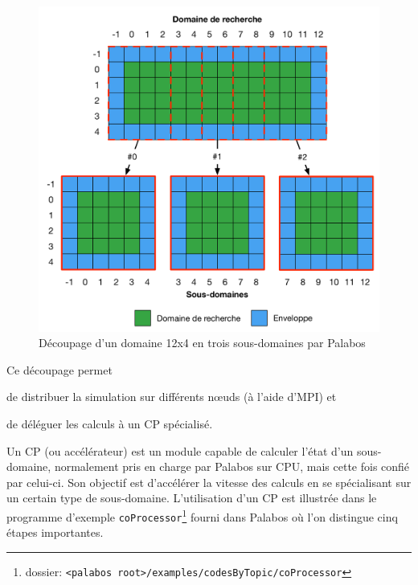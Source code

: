 \begin{figure}[h]
	\centering
	\includegraphics[scale=0.65, fbox]{images/decoupage_domaine_palabos.pdf}
	\caption{Découpage d'un domaine 12x4 en trois sous-domaines par Palabos}
	\label{fig:plb_domain_split}
\end{figure}

Ce découpage permet
\begin{enumerate*}
\item de distribuer la simulation sur différents nœuds (à l'aide d'\acs{MPI}) et
\item de déléguer les calculs à un \ac{CP} spécialisé.
\end{enumerate*}

Un \ac{CP} (ou accélérateur) est un module capable de calculer l'état d'un sous-domaine, normalement pris en charge par Palabos sur \ac{CPU}, mais cette fois confié par celui-ci. Son objectif est d'accélérer la vitesse des calculs en se spécialisant sur un certain type de sous-domaine. L'utilisation d'un \ac{CP} est illustrée dans le programme d'exemple \texttt{coProcessor}\footnote{dossier: \texttt{<palabos root>/examples/codesByTopic/coProcessor}} fourni dans Palabos où l'on distingue cinq étapes importantes.

